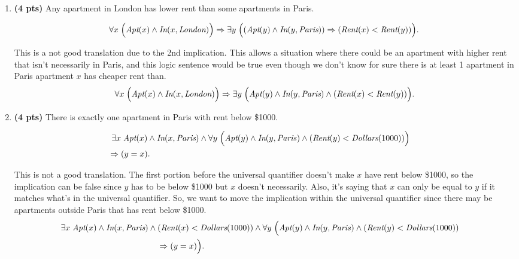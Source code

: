 \documentclass{article}
\begin{document}
\begin{enumerate}
\begin{enumerate}[label=($\alph*$)]

    \item \textbf{(4 pts)} Any apartment in London has lower rent than some apartments in Paris.

    \[\forall x \; \Bigl( \mbox{\it Apt}(x) \wedge \mbox{\it In}(x, \mbox{\it London})\Bigr)\Rightarrow \exists y\; \Bigl( (\mbox{\it Apt}(y) \wedge \mbox{\it In}(y, \mbox{\it Paris}))\Rightarrow \left(\mbox{\it Rent}(x) < \mbox{\it Rent}(y)\right)\Bigr).\]

    \color{blue}
        This is a not good translation due to the 2nd implication. This allows a situation where there could be an apartment with higher rent that isn't necessarily in Paris, and this logic sentence would be true even though we don't know for sure there is at least 1 apartment in Paris apartment $x$ has cheaper rent than.
        \[\forall x \; \Bigl( \mbox{\it Apt}(x) \wedge \mbox{\it In}(x, \mbox{\it London})\Bigr)\Rightarrow \exists y\; \Bigl( \mbox{\it Apt}(y) \wedge \mbox{\it In}(y, \mbox{\it Paris}) \wedge \left(\mbox{\it Rent}(x) < \mbox{\it Rent}(y)\right)\Bigr).\]
    \color{black}



    \item \textbf{(4 pts)} There is exactly one apartment in Paris with rent below \$1000.

    \begin{eqnarray*}\exists x \; \mbox{\it Apt}(x) \wedge \mbox{\it In}(x, \mbox{\it Paris}) \wedge \forall y \;\Bigl(\mbox{\it Apt}(y) \wedge \mbox{\it In}(y, {\it Paris}) \wedge(\mbox{\it Rent}(y) < \mbox{\it Dollars}(1000))\Bigr) & & \\& \hspace*{-5in} \Rightarrow (y = x). &\end{eqnarray*}

    \color{blue}
        This is not a good translation. The first portion before the universal quantifier doesn't make $x$ have rent below \$1000, so the implication can be false since $y$ has to be below \$1000 but $x$ doesn't necessarily. Also, it's saying that $x$ can only be equal to $y$ if it matches what's in the universal quantifier. So, we want to move the implication within the universal quantifier since there may be apartments outside Paris that has rent below \$1000.
        \begin{eqnarray*}\exists x \; \mbox{\it Apt}(x) \wedge \mbox{\it In}(x, \mbox{\it Paris}) \wedge (\mbox{\it Rent}(x) < \mbox{\it Dollars}(1000)) \wedge \forall y \;\Bigl(\mbox{\it Apt}(y) \wedge \mbox{\it In}(y, {\it Paris}) \wedge(\mbox{\it Rent}(y) < \mbox{\it Dollars}(1000)) & & \\& \hspace*{-5in} \Rightarrow (y = x)\Bigr). &\end{eqnarray*}
    \color{black}


\end{enumerate}
\end{enumerate}
\end{document}
